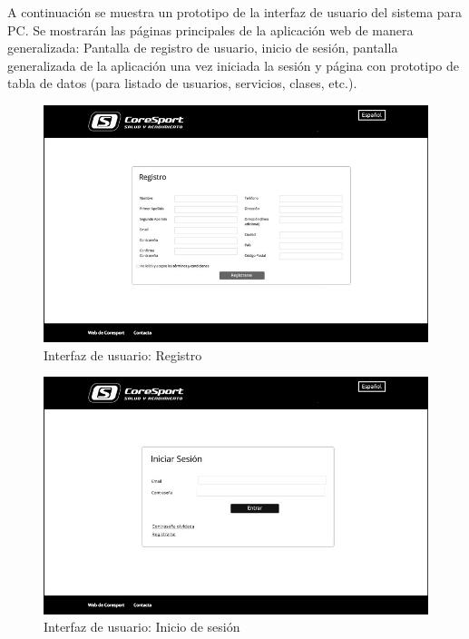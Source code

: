 A continuación se muestra un prototipo de la interfaz de usuario del sistema para PC. Se mostrarán las páginas principales de la aplicación web de manera generalizada: Pantalla de registro de usuario, inicio de sesión, pantalla generalizada de la aplicación una vez iniciada la sesión y página con prototipo de tabla de datos (para listado de usuarios, servicios, clases, etc.).   



\begin{figure}[h!]
\centering
  \includegraphics[scale=.40]{img/interfaz/registro.jpg}
  \caption{Interfaz de usuario: Registro}
  \label{fig:interfaz-registro}
\end{figure}

\vspace{10mm}

\begin{figure}[h!]
\centering
  \includegraphics[scale=.40]{img/interfaz/inicio-sesion.jpg}
  \caption{Interfaz de usuario: Inicio de sesión}
  \label{fig:interfaz-inicio-sesion}
\end{figure}


